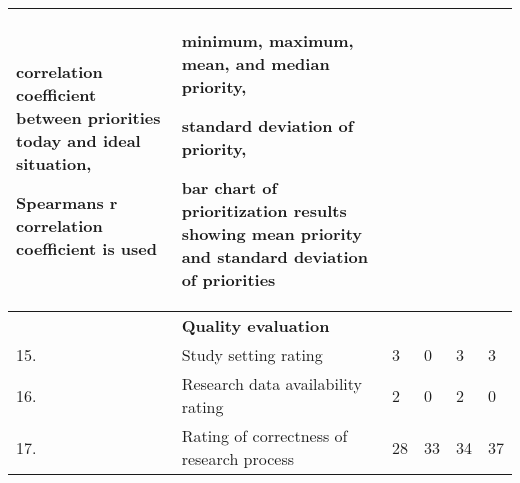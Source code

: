 \begin{table}[ht]
{\begin{tabular}{|>{\raggedright}p{}|>{\raggedright}p{}|>{\raggedright}p{}|>{\raggedright}p{}|>{\raggedright}p{}|>{\raggedright}p{}|}
correlation coefficient between priorities today and ideal situation,

Spearmans r correlation coefficient is used
 & 
minimum, maximum, mean, and median priority, 

standard deviation of priority,

bar chart of prioritization results showing mean priority and standard deviation of priorities

\tabularnewline
\hline 
 & \textbf{Quality evaluation} &  &  &  & \tabularnewline
\hline 
15. & Study setting rating & 3 & 0 & 3 & 3\tabularnewline
\hline 
16. & Research data availability rating & 2 & 0 & 2 & 0\tabularnewline
\hline 
17. & Rating of correctness of research process & 28 & 33 & 34 & 37\tabularnewline
\hline
\end{tabular}%
}
\end{table}

